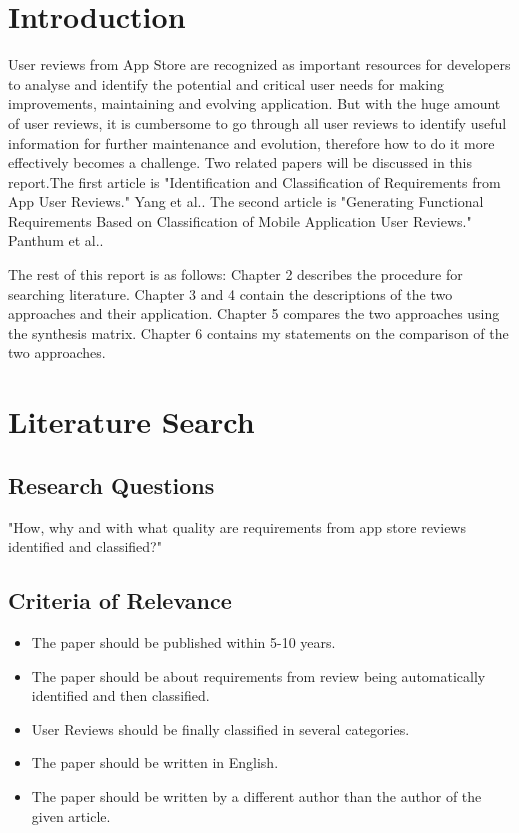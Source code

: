 \chapter{Introduction}
User reviews from App Store are recognized as important resources for developers to analyse and identify the potential and critical user needs for making improvements, maintaining and evolving application. But with the huge amount of user reviews, it is cumbersome to go through all user reviews to identify useful information for further maintenance and evolution, therefore how to do it more effectively becomes a challenge. Two related papers will be discussed in this report.The first article is "Identification and Classification of Requirements from App User Reviews." Yang et al.\cite{YangLiang2015}. The second article is "Generating Functional Requirements Based on Classification of Mobile Application User Reviews." Panthum et al.\cite{PanthumSenivongse2021}. 

The rest of this report is as follows: Chapter 2 describes the procedure for searching literature. Chapter 3 and 4 contain the descriptions of the two approaches and their application. Chapter 5 compares the two approaches using the synthesis matrix. Chapter 6 contains my statements on the comparison of the two approaches.

\chapter{Literature Search}


\section{Research Questions}
"How, why and with what quality are requirements from app store reviews identified and classified?"


\section{Criteria of Relevance}

\begin{itemize}
\item The paper should be published within 5-10 years. 
\item The paper should be about requirements from review being automatically identified and then classified. 
\item User Reviews should be finally classified in several categories.
\item The paper should be written in English.
\item The paper should be written by a different author than the author of the given article.
\end{itemize}


